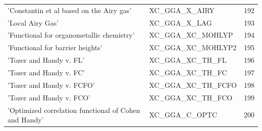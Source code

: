 \documentclass[final,12pt,makeidx,DIV=calc]{article}
\begin{document}
{{{{{{\begin{table}[!h]
\begin{center}
\begin{tabular}{llr}
  'Constantin et al based on the Airy gas' & XC\_GGA\_X\_AIRY  &192\\
  'Local Airy Gas' & XC\_GGA\_X\_LAG  &193\\
  'Functional for organometallic chemistry' & XC\_GGA\_XC\_MOHLYP  &194\\
  'Functional for barrier heights' & XC\_GGA\_XC\_MOHLYP2  &195\\
  'Tozer and Handy v. FL' & XC\_GGA\_XC\_TH\_FL  &196\\
  'Tozer and Handy v. FC' & XC\_GGA\_XC\_TH\_FC  &197\\
  'Tozer and Handy v. FCFO' & XC\_GGA\_XC\_TH\_FCFO  &198\\
  'Tozer and Handy v. FCO' & XC\_GGA\_XC\_TH\_FCO  &199\\
  'Optimized correlation functional of Cohen and Handy' & XC\_GGA\_C\_OPTC  &200\\
\hline
\hline
\end{tabular}
\end{center}
\end{table}

}}}}}}
\end{document}

